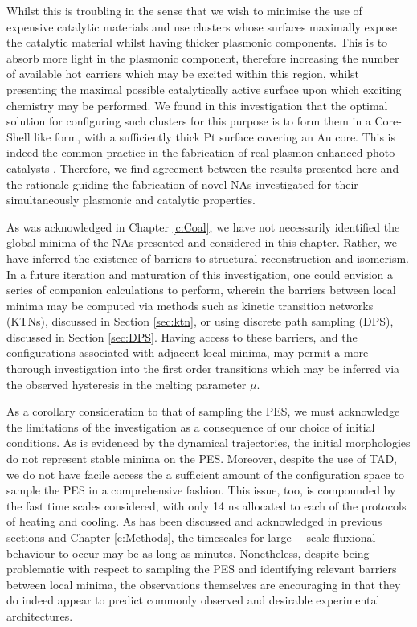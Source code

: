 Whilst this is troubling in the sense that we wish to minimise the use of expensive catalytic materials and use clusters whose surfaces maximally expose the catalytic material whilst having thicker plasmonic components. This is to absorb more light in the plasmonic component, therefore increasing the number of available hot carriers which may be excited within this region, whilst presenting the maximal possible catalytically active surface upon which exciting chemistry may be performed. We found in this investigation that the optimal solution for configuring such clusters for this purpose is to form them in a Core-Shell like form, with a sufficiently thick Pt surface covering an Au core. This is indeed the common practice in the fabrication of real plasmon enhanced photo-catalysts \cite{JorgeStructure,Jorge2019,Jorge2021}. Therefore, we find agreement between the results presented here and the rationale guiding the fabrication of novel NAs investigated for their simultaneously plasmonic and catalytic properties.

As was acknowledged in Chapter \ref{c:Coal}, we have not necessarily identified the global minima of the NAs presented and considered in this chapter. Rather, we have inferred the existence of barriers to structural reconstruction and isomerism. In a future iteration and maturation of this investigation, one could envision a series of companion calculations to perform, wherein the barriers between local minima may be computed via methods such as kinetic transition networks (KTNs), discussed in Section  \ref{sec:ktn}, or using discrete path sampling (DPS), discussed in Section \ref{sec:DPS}. Having access to these barriers, and the configurations associated with adjacent local minima, may permit a more thorough investigation into the first order transitions which may be inferred via the observed hysteresis in the melting parameter $\mu$. 

As a corollary consideration to that of sampling the PES, we must acknowledge the limitations of the investigation as a consequence of our choice of initial conditions. As is evidenced by the dynamical trajectories, the initial morphologies do not represent stable minima on the PES. Moreover, despite the use of TAD, we do not have facile access the a sufficient amount of the configuration space to sample the PES in a comprehensive fashion. This issue, too, is compounded by the fast time scales considered, with only 14 ns allocated to each of the protocols of heating and cooling. As has been discussed and acknowledged in previous sections and Chapter \ref{c:Methods}, the timescales for large~-~scale fluxional behaviour to occur may be as long as minutes. Nonetheless, despite being problematic with respect to sampling the PES and identifying relevant barriers between local minima, the observations themselves are encouraging in that they do indeed appear to predict commonly observed and desirable experimental architectures.

